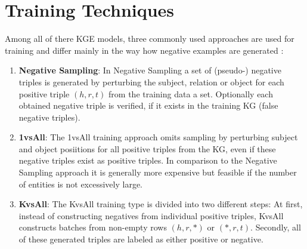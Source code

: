 \section{Training Techniques}
Among all of there \ac{KGE} models, three commonly used approaches are used for training and differ mainly in the way how negative examples are generated \cite{Ruffinelli2020You}:

\begin{enumerate}
    \item \textbf{Negative Sampling}:  
    In Negative Sampling a set of (pseudo-) negative triples is generated by perturbing the subject, relation or object for each positive triple $(h, r, t)$ from the training data a set.
    Optionally each obtained negative triple is verified, if it exists in the training \ac{KG} (false negative triples).

    \item \textbf{1vsAll}:
    The 1vsAll training approach omits sampling by perturbing subject and object posiitions for all positive triples from the \ac{KG}, even if these negative triples exist as positive triples.
    In comparison to the Negative Sampling approach it is generally more expensive but feasible if the number of entities is not excessively large.
    
    \item \textbf{KvsAll}:
    The KvsAll training type is divided into two different steps:
    At first, instead of constructing negatives from individual positive triples, KvsAll constructs batches from non-empty rows $(h,r,*)$ or $(*,r,t)$.
    Secondly, all of these generated triples are labeled as either positive or negative.
\end{enumerate}



